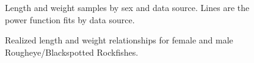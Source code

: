 \documentclass[
]{scrartcl}
\begin{document}
\newpage

\begin{figure}[H]


\caption{\label{fig-LW1}Length and weight samples by sex and data
source. Lines are the power function fits by data source.}

\end{figure}%

\begin{figure}[H]


\caption{\label{fig-LW2}Realized length and weight relationships for
female and male Rougheye/Blackspotted Rockfishes.}

\end{figure}%
\end{document}
